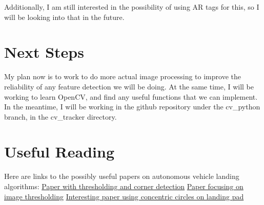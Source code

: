 \documentclass{article}
\begin{document}
	Additionally, I am still interested in the possibility of using AR tags for this, so I will be looking into that in the future.
	
	\section{Next Steps}
	My plan now is to work to do more actual image processing to improve the reliability of any feature detection we will be doing. At the same time, I will be working to learn OpenCV, and find any useful functions that we can implement. In the meantime, I will be working in the github repository under the cv\_python branch, in the cv\_tracker directory.
	
	\section{Useful Reading}
	Here are links to the possibly useful papers on autonomous vehicle landing algorithms:\newline
	\href{http://citeseerx.ist.psu.edu/viewdoc/download?doi=10.1.1.24.7707&rep=rep1&type=pdf}{Paper with thresholding and corner detection}\newline
	\href{https://claraty.jpl.nasa.gov/man/overview/publications/related/03_montgomery_helicopter_icra.pdf}{Paper focusing on image thresholding}\newline
	\href{http://www.dis.uniroma1.it/lmarchetti/private/quadrotor/lange-vision-based-onboard-approach-landing-position-control-UAV-gps-denied-environments.pdf}{Interesting paper using concentric circles on landing pad}
	
\end{document}
